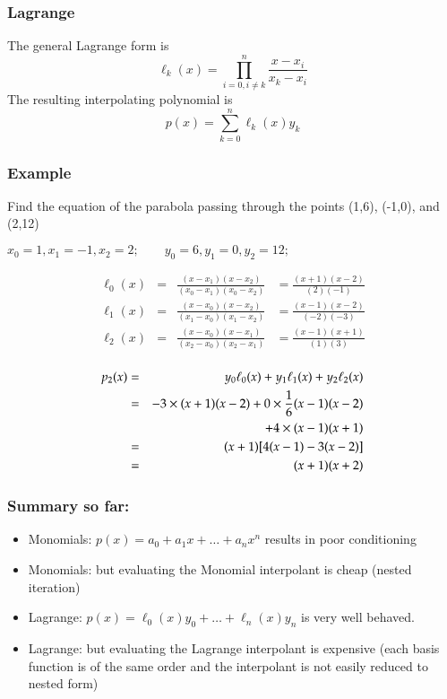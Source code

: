 \documentclass[10pt]{beamer}
\begin{document}
\begin{frame}
\frametitle{Lagrange}
The general Lagrange form is
\begin{equation*}
  \ell_k(x) = \prod_{i=0,i\ne k}^{n} \frac{x-x_i}{x_k - x_i}
\end{equation*}
The resulting interpolating polynomial is
\begin{equation*}
  p(x) = \sum_{k=0}^n \ell_k(x) y_k
\end{equation*}
\end{frame}
\begin{frame}
\frametitle{Example}
Find the equation of the parabola passing through the points
(1,6), (-1,0), and (2,12)

\begin{block}{}
$ x_0 = 1, x_1 = -1, x_2 = 2; \qquad y_0 = 6, y_1 = 0, y_2 = 12; $
\end{block}
\[
\begin{array}{llll} 
\ell_0 (x) & = & \frac{(x-x_1)(x-x_2)}{(x_0-x_1)(x_0-x_2)} & 
        = \frac{(x+1)(x-2)}{(2)(-1) } \\
\ell_1 (x) & = & \frac{(x-x_0)(x-x_2)}{(x_1-x_0)(x_1-x_2)} & 
        = \frac{(x-1)(x-2)}{(-2)(-3) } \\
\ell_2 (x) & = & \frac{(x-x_0)(x-x_1)}{(x_2-x_0)(x_2-x_1)} & 
        = \frac{(x-1)(x+1)}{(1)(3) } \\
\end{array} 
\] 

\begin{eqnarray*} 
p_2(x)  & = & y_0 \ell_0(x) + y_1 \ell_1(x) + y_2 \ell_2(x) \\ 
        & = & -3 \times (x+1)(x-2) + 0 \times {1\over 6} (x-1)(x-2) \\
& & \ + 4 \times (x-1)(x+1) \\
 & = & (x+1) [ 4 (x-1) - 3 (x-2) ] \\
 & =  & (x+1) (x + 2 ) 
\end{eqnarray*}
\end{frame}
\begin{frame}
\frametitle{Summary so far:}
\begin{itemize}
  \item Monomials: $p(x) = a_0 + a_1 x +\dots+a_n x^n$ results in poor
conditioning
  \item Monomials: but evaluating the Monomial interpolant is cheap
(nested iteration)
  \item Lagrange: $p(x) = \ell_0(x) y_0 + \dots + \ell_n(x) y_n$ is very
well behaved.
  \item Lagrange: but evaluating the Lagrange interpolant is expensive
(each basis function is of the same order and the interpolant is not
easily reduced to nested form)
\end{itemize}
\end{frame}
\end{document}
